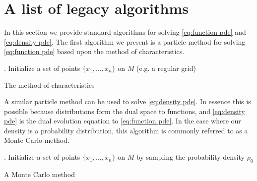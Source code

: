 \documentclass[12pt]{amsart}
\begin{document}

\appendix

\section{A list of legacy algorithms}
\label{app:algorithms}
In this section we provide standard algorithms for solving \eqref{eq:function pde} and \eqref{eq:density pde}.
The first algorithm we present is a particle method for solving \ref{eq:function pde} based upon the method of characteristics.

\begin{algorithm}[h]
	.
	Initialize a set of points $\{ x_{1},\dots,x_{n} \}$ on $M$ (e.g. a regular grid) \;
	\caption{The method of characteristics}\label{alg:particle}
\end{algorithm}

A similar particle method can be used to solve \eqref{eq:density pde}.
In essence this is possible because distributions form the dual space to functions, and \eqref{eq:density pde} is the dual evolution equation to \eqref{eq:function pde}.
In the case where our density is a probability distribution, this algorithm is commonly referred to as a Monte Carlo method.

\begin{algorithm}[h]
	.
	Initialize a set of points $\{ x_{1},\dots,x_{n} \}$ on $M$ by sampling the probability density $\rho_{0}$\;
	\caption{A Monte Carlo method}\label{alg:Monte Carlo}
\end{algorithm}
\end{document}
